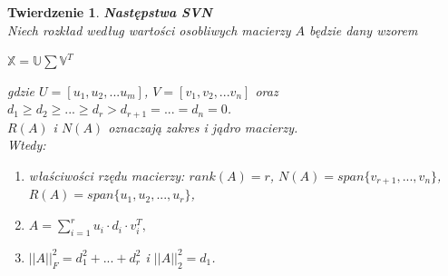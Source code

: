 \documentclass[12pt,a4paper]{report}
\newtheorem{tw}{Twierdzenie}
\begin{document}
\begin{tw}\textbf{Następstwa SVN}%
\\Niech rozkład według wartości osobliwych macierzy $A$ będzie dany wzorem
\begin{center}
$\mathbb{X}=\mathbb{U}\sum \mathbb{V}^T$
\end{center}
gdzie $U=[u_1,u_2,...u_m]$, $V = [v_1,v_2,...v_n]$ oraz 
\\$d_1\geq d_2 \geq ... \geq d_r > d_{r+1} = ... = d_n = 0$.
\\$R(A)$ i $N(A)$ oznaczają zakres i jądro macierzy.
\\Wtedy:
\begin{enumerate}
\item właściwości rzędu macierzy: $rank(A) = r$, $N(A) = span\{v_{r+1},...,v_n \}$, 
\\$R(A) = span \{u_1,u_2,...,u_r \}$,
\item $A = \sum_{i=1}^r u_i \cdot d_i \cdot v_i^T,$
\item $||A||_F^2 = d_1^2+...+d_r^2$ i $||A||_2^2 = d_1$.
\end{enumerate}
\end{tw}
\end{document}
